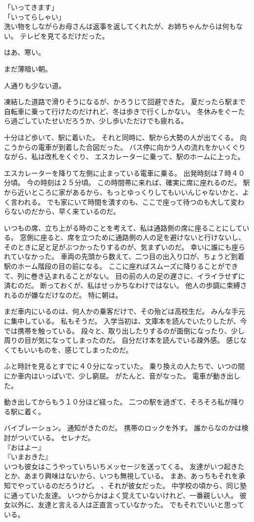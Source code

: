 \documentclass[../IHMain]{subfiles}
\begin{document}
「いってきます」\\
「いってらしゃい」\\
洗い物をしながらお母さんは返事を返してくれたが、お姉ちゃんからは何もない。
テレビを見てるだけだった。

はあ、寒い。

まだ薄暗い朝。

人通りも少ない道。

凍結した道路で滑りそうになるが、かろうじて回避できた。
夏だったら駅まで自転車に乗って行けたのだけれど、冬は歩きで行くしかない。
冬休みをぐーたら過ごしていたせいだろうか、少し歩いただけでも疲れる。

十分ほど歩いて、駅に着いた。
それと同時に、駅から大勢の人が出てくる。
向こうからの電車が到着した合図だった。
バス停に向かう人の流れをかいくぐりながら、私は改札をくぐり、
エスカレーターに乗って、駅のホームに上った。

エスカレーターを降りて左側に止まっている電車に乗る。
出発時刻は７時４０分頃。
今の時刻は２５分頃。
この時間帯に来れば、確実に席に座れるのだ。
駅から近いところに家があるから、もっとゆっくりしてもいいんじゃないかと、よく言われる。
でも家にいて時間を潰すのも、ここで座って待つのも大して変わらないのだから、早く来ているのだ。

いつもの席、立ち上がる時のことを考えて、私は通路側の席に座ることにしている。
窓側に座ると、席を立つために通路側の人の足を避けないと行けないし、
そのときに足と足がぶつかったりするのが、気まずいのだ。
幸いに誰にも座られていなかった。
車両の先頭から数えて、二つ目の出入り口が、ちょうど到着駅のホーム階段の目の前になる。
ここに座ればスムーズに降りることができて、列に巻き込まれることがない。
目の前の人の足の遅さに、イライラせずに済むのだ。
断っておくが、私はせっかちなわけではない。
他人の歩調に束縛されるのが嫌なだけなのだ。
特に朝は。

まだ車内にいるのは、何人かの乗客だけで、その殆どは高校生だ。
みんな手元に集中している。
私もそうだ。
入学当初は、文庫本を読んでいたりしたが、今では携帯を触っている。
段々と、取り出したりするのが面倒になったり、少し周りの目が気になってしまったのだ。
自分だけ本を読んでいる疎外感。
感じなくてもいいものを、感じてしまったのだ。

ふと時計を見るとすでに４０分になっていた。
乗り換えの人たちで、いつの間にか車内はいっぱいで、少し窮屈。
がたんと、音がなった。
電車が動き出した。

動き出してからもう１０分ほど経った。
二つの駅を過ぎて、そろそろ私が降りる駅に着く。

バイブレーション。
通知がきたのだ。
携帯のロックを外す。
誰からなのかは検討がついている。
セレナだ。\\
『おはよー』\\
『いまおきた』\\
いつも彼女はこうやっていちいちメッセージを送ってくる。
友達がいつ起きたとか、あまり興味はないから、いつも無視している。
まあ、あっちもそれを承知でやっているのだろうけど。
、それが彼女だった。
中学校の頃から、同じ塾に通っていた友達。
いつからかはよく覚えていないけれど、一番親しい人。
彼女以外に、友達と言える人は正直言っていなかった。
でもそれでいいと思っている。
\end{document}
